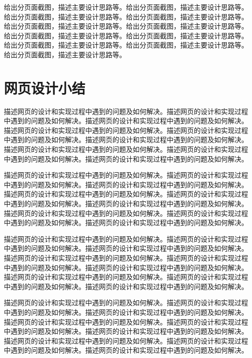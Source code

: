 \documentclass[supercite]{Experimental_Report}
\theoremstyle{definition}
\begin{document}
	给出分页面截图，描述主要设计思路等。给出分页面截图，描述主要设计思路等。给出分页面截图，描述主要设计思路等。给出分页面截图，描述主要设计思路等。给出分页面截图，描述主要设计思路等。给出分页面截图，描述主要设计思路等。给出分页面截图，描述主要设计思路等。给出分页面截图，描述主要设计思路等。给出分页面截图，描述主要设计思路等。给出分页面截图，描述主要设计思路等。给出分页面截图，描述主要设计思路等。
	
	\newpage
	
	\section{网页设计小结}
	
	描述网页的设计和实现过程中遇到的问题及如何解决。描述网页的设计和实现过程中遇到的问题及如何解决。描述网页的设计和实现过程中遇到的问题及如何解决。描述网页的设计和实现过程中遇到的问题及如何解决。描述网页的设计和实现过程中遇到的问题及如何解决。描述网页的设计和实现过程中遇到的问题及如何解决。描述网页的设计和实现过程中遇到的问题及如何解决。描述网页的设计和实现过程中遇到的问题及如何解决。描述网页的设计和实现过程中遇到的问题及如何解决。
	
	描述网页的设计和实现过程中遇到的问题及如何解决。描述网页的设计和实现过程中遇到的问题及如何解决。描述网页的设计和实现过程中遇到的问题及如何解决。描述网页的设计和实现过程中遇到的问题及如何解决。描述网页的设计和实现过程中遇到的问题及如何解决。描述网页的设计和实现过程中遇到的问题及如何解决。描述网页的设计和实现过程中遇到的问题及如何解决。描述网页的设计和实现过程中遇到的问题及如何解决。描述网页的设计和实现过程中遇到的问题及如何解决。
	
	描述网页的设计和实现过程中遇到的问题及如何解决。描述网页的设计和实现过程中遇到的问题及如何解决。描述网页的设计和实现过程中遇到的问题及如何解决。描述网页的设计和实现过程中遇到的问题及如何解决。描述网页的设计和实现过程中遇到的问题及如何解决。描述网页的设计和实现过程中遇到的问题及如何解决。描述网页的设计和实现过程中遇到的问题及如何解决。描述网页的设计和实现过程中遇到的问题及如何解决。描述网页的设计和实现过程中遇到的问题及如何解决。
	
	描述网页的设计和实现过程中遇到的问题及如何解决。描述网页的设计和实现过程中遇到的问题及如何解决。描述网页的设计和实现过程中遇到的问题及如何解决。描述网页的设计和实现过程中遇到的问题及如何解决。描述网页的设计和实现过程中遇到的问题及如何解决。描述网页的设计和实现过程中遇到的问题及如何解决。描述网页的设计和实现过程中遇到的问题及如何解决。描述网页的设计和实现过程中遇到的问题及如何解决。描述网页的设计和实现过程中遇到的问题及如何解决。
	
\end{document}
